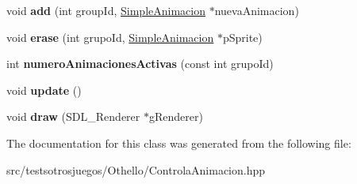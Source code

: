 \begin{DoxyCompactItemize}
\item 
void {\bfseries add} (int group\+Id, \hyperlink{class_simple_animacion}{Simple\+Animacion} $\ast$nueva\+Animacion)\hypertarget{class_controla_animacion_a83626ec71f363601ee1c268cd4b0630b}{}\label{class_controla_animacion_a83626ec71f363601ee1c268cd4b0630b}

\item 
void {\bfseries erase} (int grupo\+Id, \hyperlink{class_simple_animacion}{Simple\+Animacion} $\ast$p\+Sprite)\hypertarget{class_controla_animacion_a562efb1df59377cb7c451106ffe85f9b}{}\label{class_controla_animacion_a562efb1df59377cb7c451106ffe85f9b}

\item 
int {\bfseries numero\+Animaciones\+Activas} (const int grupo\+Id)\hypertarget{class_controla_animacion_a3fa11f8372987007fc7849f536693034}{}\label{class_controla_animacion_a3fa11f8372987007fc7849f536693034}

\item 
void {\bfseries update} ()\hypertarget{class_controla_animacion_a8b91ef884078facfc93ccc6aa7d24912}{}\label{class_controla_animacion_a8b91ef884078facfc93ccc6aa7d24912}

\item 
void {\bfseries draw} (S\+D\+L\+\_\+\+Renderer $\ast$g\+Renderer)\hypertarget{class_controla_animacion_ad7a57ea8853d42f4ca47b2e95525ebde}{}\label{class_controla_animacion_ad7a57ea8853d42f4ca47b2e95525ebde}

\end{DoxyCompactItemize}


The documentation for this class was generated from the following file\+:\begin{DoxyCompactItemize}
\item 
src/testsotrosjuegos/\+Othello/Controla\+Animacion.\+hpp\end{DoxyCompactItemize}
